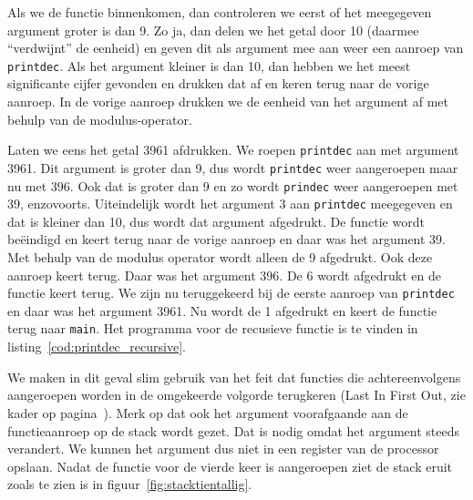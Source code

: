 Als we de functie binnenkomen, dan controleren we eerst of het meegegeven argument groter is dan 9. Zo ja, dan delen we het getal door 10 (daarmee ``verdwijnt'' de eenheid) en geven dit als argument mee aan weer een aanroep van \texttt{printdec}. Als het argument kleiner is dan 10, dan hebben we het meest significante cijfer gevonden en drukken dat af en keren terug naar de vorige aanroep. In de vorige aanroep drukken we de eenheid van het argument af met behulp van de modulus-operator.

Laten we eens het getal 3961 afdrukken. We roepen \texttt{printdec} aan met argument 3961. Dit argument is groter dan 9, dus wordt \texttt{printdec} weer aangeroepen maar nu met 396. Ook dat is groter dan 9 en zo wordt \texttt{prindec} weer aangeroepen met 39, enzovoorts. Uiteindelijk wordt het argument 3 aan \texttt{printdec} meegegeven en dat is kleiner dan 10, dus wordt dat argument afgedrukt. De functie wordt beëindigd en keert terug naar de vorige aanroep en daar was het argument 39. Met behulp van de modulus operator wordt alleen de 9 afgedrukt. Ook deze aanroep keert terug. Daar was het argument 396. De 6 wordt afgedrukt en de functie keert terug. We zijn nu teruggekeerd bij de eerste aanroep van \texttt{printdec} en daar was het argument 3961. Nu wordt de 1 afgedrukt en keert de functie terug naar \texttt{main}. Het programma voor de recusieve functie is te vinden in listing~\ref{cod:printdec_recursive}.


We maken in dit geval slim gebruik van het feit dat functies die achtereenvolgens aangeroepen worden in de omgekeerde volgorde terugkeren (Last In First Out, zie kader op pagina~\pageref{fig:stack}).
Merk op dat ook het argument voorafgaande aan de functieaanroep op de stack wordt gezet. Dat is nodig omdat het argument steeds verandert. We kunnen het argument dus niet in een register van de processor opslaan.
Nadat de functie voor de vierde keer is aangeroepen ziet de stack eruit zoals te zien is in figuur~\ref{fig:stacktientallig}.

